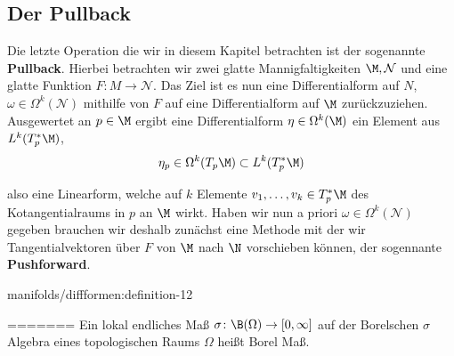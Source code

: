 \documentclass[letterpaper,10pt,english]{jupyterBook}
\begin{document}
\subsection{Der Pullback}
\label{\detokenize{manifolds/diffformen:der-pullback}}
\par
Die letzte Operation die wir in diesem Kapitel betrachten ist der sogenannte \textbf{Pullback}. Hierbei betrachten wir zwei glatte Mannigfaltigkeiten \(\M,\mathcal{N}\) und eine glatte Funktion \(F:M\to\mathcal{N}\). Das Ziel ist es nun eine Differentialform auf \(N\), \(\omega\in\Omega^k(\mathcal{N})\) mithilfe von \(F\) auf eine Differentialform auf \(\M\) zurückzuziehen. Ausgewertet an \(p\in\M\) ergibt eine Differentialform \(\eta\in\Omega^k(\M)\) ein Element aus \(L^k(T_p^\ast\M)\),
\begin{align*}
\eta_p\in \Omega^k(T_p\M) \subset L^k(T_p^\ast\M)
\end{align*}
\par
also eine Linearform, welche auf \(k\) Elemente \(v_1,\ldots,v_k\in T_p^\ast\M\) des Kotangentialraums in \(p\) an \(\M\) wirkt. Haben wir nun a priori \(\omega\in\Omega^k(\mathcal{N})\) gegeben brauchen wir deshalb zunächst eine Methode mit der wir Tangentialvektoren über \(F\) von \(\M\) nach \(\N\) vorschieben können, der sogennante \textbf{Pushforward}.
\begin{definition}{}{manifolds/diffformen:definition-12}


=======
Ein lokal endliches Maß \(\sigma \colon \B(\Omega) \rightarrow [0, \infty]\) auf der Borelschen \(\sigma\) Algebra eines topologischen Raums \(\Omega\) heißt Borel Maß.
\end{definition}
\end{document}
